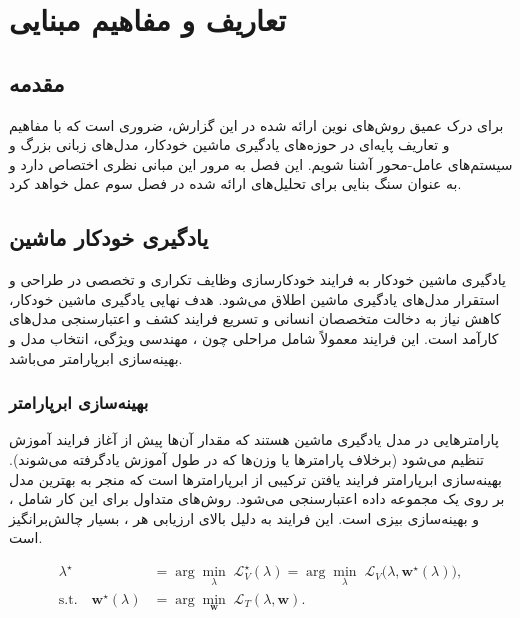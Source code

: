 
\chapter{تعاریف و مفاهیم مبنایی }
\thispagestyle{empty}
\section{مقدمه}
برای درک عمیق روش‌های نوین ارائه شده در این گزارش، ضروری است که با مفاهیم و تعاریف پایه‌ای در حوزه‌های یادگیری ماشین خودکار، مدل‌های زبانی بزرگ و سیستم‌های عامل-محور آشنا شویم. این فصل به مرور این مبانی نظری اختصاص دارد و به عنوان سنگ بنایی برای تحلیل‌های ارائه شده در فصل سوم عمل خواهد کرد.

\section{یادگیری خودکار ماشین}
یادگیری ماشین خودکار به فرایند خودکارسازی وظایف تکراری و تخصصی در طراحی و استقرار مدل‌های یادگیری ماشین اطلاق می‌شود. هدف نهایی یادگیری ماشین خودکار، کاهش نیاز به دخالت متخصصان انسانی و تسریع فرایند کشف و اعتبارسنجی مدل‌های کارآمد است. این فرایند معمولاً شامل مراحلی چون ، مهندسی ویژگی، انتخاب مدل و بهینه‌سازی ابرپارامتر می‌باشد.

\subsection{بهینه‌سازی ابرپارامتر}
 پارامترهایی در مدل یادگیری ماشین هستند که مقدار آن‌ها پیش از آغاز فرایند آموزش تنظیم می‌شود (برخلاف پارامترها یا وزن‌ها که در طول آموزش یادگرفته می‌شوند). بهینه‌سازی ابرپارامتر فرایند یافتن ترکیبی از ابرپارامترها است که منجر به بهترین  مدل بر روی یک مجموعه داده اعتبارسنجی می‌شود. روش‌های متداول برای این کار شامل ،  و بهینه‌سازی بیزی است. این فرایند به دلیل  بالای ارزیابی هر ، بسیار چالش‌برانگیز است.

\begin{align}
\lambda^\star &= \arg\min_{\lambda}\; \mathcal{L}_V^\star(\lambda)
= \arg\min_{\lambda}\; \mathcal{L}_V\!\big(\lambda, \mathbf{w}^\star(\lambda)\big), \\
\text{s.t.}\quad \mathbf{w}^\star(\lambda) &= \arg\min_{\mathbf{w}}\; \mathcal{L}_T(\lambda, \mathbf{w}) .
\end{align}

